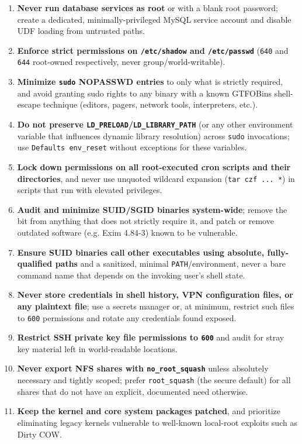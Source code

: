 \documentclass[11pt]{article}
\begin{document}
\begin{enumerate}[label=R\arabic*.]
  \item \textbf{Never run database services as root} or with a blank root password; create a
        dedicated, minimally-privileged MySQL service account and disable UDF loading from
        untrusted paths.
  \item \textbf{Enforce strict permissions on \texttt{/etc/shadow} and \texttt{/etc/passwd}}
        (\texttt{640} and \texttt{644} root-owned respectively, never group/world-writable).
  \item \textbf{Minimize \texttt{sudo} NOPASSWD entries} to only what is strictly required, and
        avoid granting sudo rights to any binary with a known GTFOBins shell-escape technique
        (editors, pagers, network tools, interpreters, etc.).
  \item \textbf{Do not preserve \texttt{LD\_PRELOAD}/\texttt{LD\_LIBRARY\_PATH}} (or any other
        environment variable that influences dynamic library resolution) across \texttt{sudo}
        invocations; use \texttt{Defaults env\_reset} without exceptions for these variables.
  \item \textbf{Lock down permissions on all root-executed cron scripts and their directories},
        and never use unquoted wildcard expansion (\texttt{tar czf ... *}) in scripts that run
        with elevated privileges.
  \item \textbf{Audit and minimize SUID/SGID binaries system-wide}; remove the bit from anything
        that does not strictly require it, and patch or remove outdated software (e.g. Exim
        4.84-3) known to be vulnerable.
  \item \textbf{Ensure SUID binaries call other executables using absolute, fully-qualified
        paths} and a sanitized, minimal \texttt{PATH}/environment, never a bare command name that
        depends on the invoking user's shell state.
  \item \textbf{Never store credentials in shell history, VPN configuration files, or any
        plaintext file}; use a secrets manager or, at minimum, restrict such files to
        \texttt{600} permissions and rotate any credentials found exposed.
  \item \textbf{Restrict SSH private key file permissions to \texttt{600}} and audit for stray
        key material left in world-readable locations.
  \item \textbf{Never export NFS shares with \texttt{no\_root\_squash}} unless absolutely
        necessary and tightly scoped; prefer \texttt{root\_squash} (the secure default) for all
        shares that do not have an explicit, documented need otherwise.
  \item \textbf{Keep the kernel and core system packages patched}, and prioritize eliminating
        legacy kernels vulnerable to well-known local-root exploits such as Dirty COW.
\end{enumerate}
\end{document}
